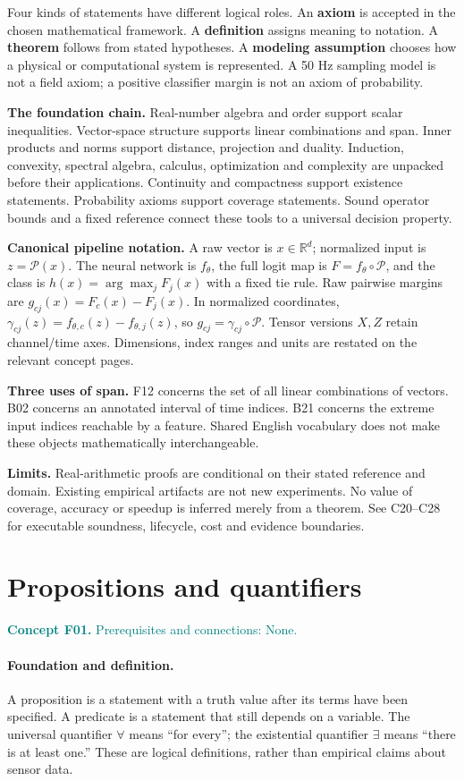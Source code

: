 \documentclass[11pt,a4paper]{article}
\newcommand{\R}{\mathbb R}
\newcommand{\conceptid}{Front matter}
\newcommand{\concept}[3]{\clearpage\renewcommand{\conceptid}{#1}%
\section{#2}\label{concept:#1}%
\textcolor{teal}{\textbf{Concept #1.} Prerequisites and connections: #3.}\par
\typeout{ECDR-CONCEPT-START #1 PAGE=\thepage}}
\begin{document}
Four kinds of statements have different logical roles. An \textbf{axiom}
is accepted in the chosen mathematical framework. A \textbf{definition}
assigns meaning to notation. A \textbf{theorem} follows from stated
hypotheses. A \textbf{modeling assumption} chooses how a physical or
computational system is represented. A 50 Hz sampling model is not a
field axiom; a positive classifier margin is not an axiom of probability.

\textbf{The foundation chain.} Real-number algebra and order support scalar
inequalities. Vector-space structure supports linear combinations and
span. Inner products and norms support distance, projection and duality.
Induction, convexity, spectral algebra, calculus, optimization and
complexity are unpacked before their applications.
Continuity and compactness support existence statements. Probability
axioms support coverage statements. Sound operator bounds and a fixed
reference connect these tools to a universal decision property.

\textbf{Canonical pipeline notation.} A raw vector is $x\in\R^d$;
normalized input is $z=\mathcal P(x)$. The neural network is $f_\theta$,
the full logit map is $F=f_\theta\circ\mathcal P$, and the class is
$h(x)=\arg\max_jF_j(x)$ with a fixed tie rule. Raw pairwise margins are
$g_{cj}(x)=F_c(x)-F_j(x)$. In normalized coordinates,
$\gamma_{cj}(z)=f_{\theta,c}(z)-f_{\theta,j}(z)$, so
$g_{cj}=\gamma_{cj}\circ\mathcal P$. Tensor versions $X,Z$ retain
channel/time axes. Dimensions, index ranges and units are restated on the
relevant concept pages.

\textbf{Three uses of span.} F12 concerns the set of all linear combinations
of vectors. B02 concerns an annotated interval of time indices. B21
concerns the extreme input indices reachable by a feature. Shared English
vocabulary does not make these objects mathematically interchangeable.

\textbf{Limits.} Real-arithmetic proofs are conditional on their stated
reference and domain. Existing empirical artifacts are not new experiments.
No value of coverage, accuracy or speedup is inferred merely from a theorem.
See C20--C28 for executable soundness, lifecycle, cost and evidence boundaries.
\clearpage
\begingroup\small\setlength{\parskip}{0pt}\tableofcontents\endgroup

\concept{F01}{Propositions and quantifiers}{None}
\paragraph{Foundation and definition.}
A proposition is a statement with a truth value after its terms have been
specified. A predicate is a statement that still depends on a variable.
The universal quantifier $\forall$ means ``for every''; the existential
quantifier $\exists$ means ``there is at least one.'' These are logical
definitions, rather than empirical claims about sensor data.
\end{document}
